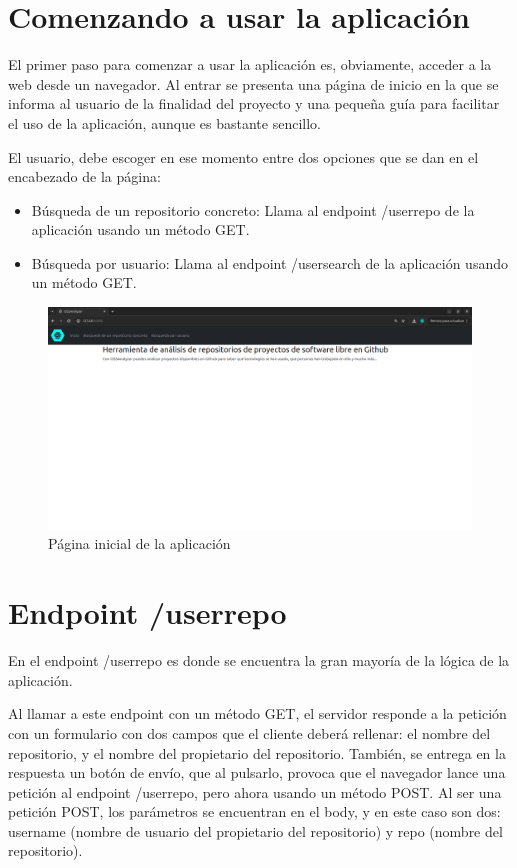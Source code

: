 \documentclass[a4paper, 12pt]{book}
\begin{document}
\section{Comenzando a usar la aplicación}
\label{sec:Empezando a usar la aplicación}

El primer paso para comenzar a usar la aplicación es, obviamente, acceder a la web desde un navegador. Al entrar se presenta una página de inicio en la que se informa al usuario de la finalidad del proyecto y una pequeña guía para facilitar el uso de la aplicación, aunque es bastante sencillo.

El usuario, debe escoger en ese momento entre dos opciones que se dan en el encabezado de la página:

\begin{itemize}
  \item Búsqueda de un repositorio concreto: Llama al endpoint /userrepo de la aplicación usando un método GET.
  \item Búsqueda por usuario: Llama al endpoint /usersearch de la aplicación usando un método GET.
\end{itemize}

\begin{figure}[H]
  \centering
  \includegraphics[width=1\textwidth]{img/paginaprincipal.png}
  \caption{Página inicial de la aplicación}
  \label{figura:appmainpage}
\end{figure}


\section{Endpoint /userrepo}
\label{sec:/userrepo}

En el endpoint /userrepo es donde se encuentra la gran mayoría de la lógica de la aplicación.

Al llamar a este endpoint con un método GET, el servidor responde a la petición con un formulario con dos campos que el cliente deberá rellenar: el nombre del repositorio, y el nombre del propietario del repositorio. También, se entrega en la respuesta un botón de envío, que al pulsarlo, provoca que el navegador lance una petición al endpoint /userrepo, pero ahora usando un método POST. Al ser una petición POST, los parámetros se encuentran en el body, y en este caso son dos: username (nombre de usuario del propietario del repositorio) y repo (nombre del repositorio).
\end{document}
